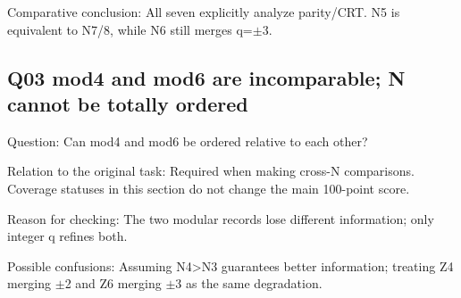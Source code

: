\documentclass[11pt,a4paper]{article}
\begin{document}
Comparative conclusion: All seven explicitly analyze parity/\allowbreak{}CRT. N5 is equivalent to N7/\allowbreak{}8,\allowbreak{} while N6 still merges q=\ensuremath{\pm}3.

\clearpage
\subsection{Q03 mod4 and mod6 are incomparable; N cannot be totally ordered}
\label{aspect:Q03}
Question: Can mod4 and mod6 be ordered relative to each other?

Relation to the original task: Required when making cross-N comparisons. Coverage statuses in this section do not change the main 100-point score.

Reason for checking: The two modular records lose different information; only integer q refines both.

Possible confusions: Assuming N4>N3 guarantees better information; treating Z4 merging \ensuremath{\pm}2 and Z6 merging \ensuremath{\pm}3 as the same degradation.
\end{document}
